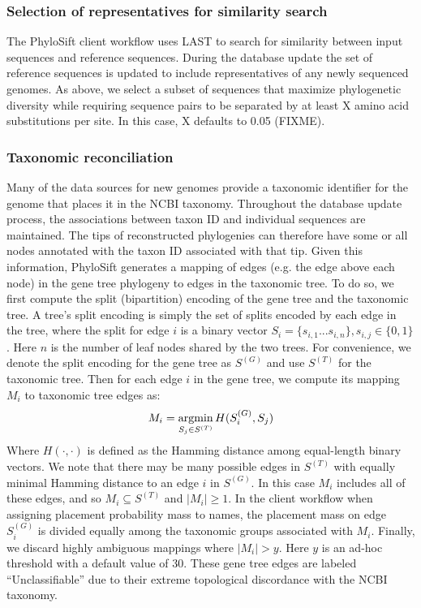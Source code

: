 \documentclass[10pt]{article}
\newcommand{\argmin}{\operatornamewithlimits{argmin}}
\begin{document}
\subsubsection*{Selection of representatives for similarity search}
The PhyloSift client workflow uses LAST to search for similarity between input sequences and reference sequences.
During the database update the set of reference sequences is updated to include representatives of any newly sequenced genomes.
As above, we select a subset of sequences that maximize phylogenetic diversity while requiring sequence pairs to be separated by at least X amino acid substitutions per site.
In this case, X defaults to 0.05 (FIXME).

\subsubsection*{Taxonomic reconciliation}
Many of the data sources for new genomes provide a taxonomic identifier for the genome that places it in the NCBI taxonomy.
Throughout the database update process, the associations between taxon ID and individual sequences are maintained.
The tips of reconstructed phylogenies can therefore have some or all nodes annotated with the taxon ID associated with that tip.
Given this information, PhyloSift generates a mapping of edges (e.g. the edge above each node) in the gene tree phylogeny to edges in the taxonomic tree.
To do so, we first compute the split (bipartition) encoding of the gene tree and the taxonomic tree.
A tree's split encoding is simply the set of splits encoded by each edge in the tree, where the split for edge $i$ is a binary vector $S_i = \{s_{i,1}...s_{i,n}\}, s_{i,j} \in \{0,1\}$.
Here $n$ is the number of leaf nodes shared by the two trees.
For convenience, we denote the split encoding for the gene tree as $S^{(G)}$ and use $S^{(T)}$ for the taxonomic tree.
Then for each edge $i$ in the gene tree, we compute its mapping $M_i$ to taxonomic tree edges as:
$$
M_i = \argmin_{S_j \in S^{(T)}} H(S^{(G)}_i, S_j)
$$
Where $H(\cdot,\cdot)$ is defined as the Hamming distance among equal-length binary vectors.
We note that there may be many possible edges in $S^{(T)}$ with equally minimal Hamming distance to an edge $i$ in $S^{(G)}$.
In this case $M_i$ includes all of these edges, and so $M_i \subseteq S^{(T)}$ and $|M_i| \geq 1$.
In the client workflow when assigning placement probability mass to names, the placement mass on edge $S^{(G)}_i$ is divided equally among the taxonomic groups associated with $M_i$.
Finally, we discard highly ambiguous mappings where $|M_i|>y$. 
Here $y$ is an ad-hoc threshold with a default value of 30.
These gene tree edges are labeled ``Unclassifiable'' due to their extreme topological discordance with the NCBI taxonomy.
\end{document}
